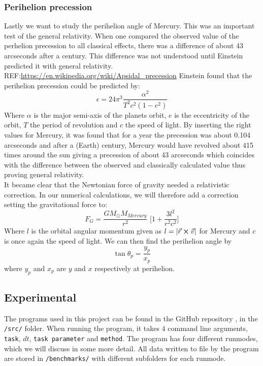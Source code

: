 \documentclass{article}
\newcommand{\husk}[1]{\color{red} #1 \color{black}}
\newcommand{\TomH}[1]{\Big[ #1 \Big]}
\begin{document}
\subsubsection{Perihelion precession}
Lastly we want to study the perihelion angle of Mercury. This was an important test of the general relativity. When one compared the observed value of the perhelion precession to all classical effects, there was a difference of about 43 arcseconds after a century. This difference was not understood until Einstein predicted it with general relativity.\husk{REF:\url{https://en.wikipedia.org/wiki/Apsidal_precession}} Einstein found that the perihelion precession could be predicted by:
\begin{equation}
\epsilon = 24 \pi^3 \frac{\alpha^2}{T^2 c^2 (1 - e^2)}
\label{eq:perihelion}
\end{equation}
Where $\alpha$ is the major semi-axis of the planets orbit, $e$ is the eccentricity of the orbit, $T$ the period of revolution and $c$ the speed of light. By inserting the right values for Mercury, it was found that for a year the precession was about 0.104 arcseconds and after a (Earth) century, Mercury would have revolved about 415 times around the sun giving a precession of about 43 arcseconds which coincides with the difference between the observed and classically calculated value thus proving general relativity. \\
It became clear that the Newtonian force of gravity needed a relativistic correction. In our numerical calculations, we will therefore add a correction setting the gravitational force to:
\begin{equation}
F_G = \frac{G M_{\odot} M_{Mercury}}{r^2} \, \, \TomH{1 + \frac{3l^2}{r^2c^2}}
\label{eq:FgGR}
\end{equation}
Where $l$ is the orbital angular momentum given as $l = |\vec{r} \cross \vec{v}|$ for Mercury and $c$ is once again the speed of light.
We can then find the perihelion angle by
\begin{equation}
\tan \theta_p = \frac{y_p}{x_p}
\end{equation}
where $y_p$ and $x_p$ are $y$ and $x$ respectively at perihelion.
\subsection{Experimental}
The programs used in this project can be found in the GitHub repository \cite{Github}, in the \texttt{/src/} folder. When running the program, it takes 4 command line arguments, \texttt{task}, $dt$, \texttt{task parameter} and \texttt{method}. The program has four different runmodes, which we will discuss in some more detail. All data written to file by the program are stored in \texttt{/benchmarks/} with different subfolders for each runmode.
\end{document}
